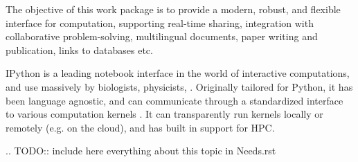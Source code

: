 \addtocounter{wpno}{1}
\begin{Workpackage}{\thewpno}
\WPTitle{\wpname{\thewpno}}

\begin{WPObjectives}
  The objective of this work package is to provide a modern, robust,
  and flexible interface for computation, supporting real-time
  sharing, integration with collaborative problem-solving,
  multilingual documents, paper writing and publication, links to
  databases etc.
\end{WPObjectives}

\begin{WPDescription}


  IPython is a leading notebook interface in the world of interactive
  computations, and use massively by biologists, physicists, . Originally tailored for Python, it has been
  language agnostic, and can communicate through a standardized
  interface to various computation kernels . It can
  transparently run kernels locally or remotely (e.g. on the cloud),
  and has built in support for HPC.


  .. TODO:: include here everything about this topic in Needs.rst
\end{WPDescription}



\end{Workpackage}
